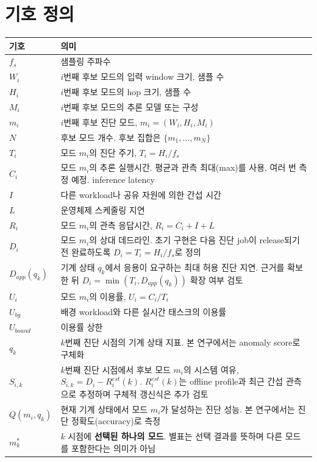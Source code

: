 \documentclass[10pt]{article}
\begin{document}
\section{기호 정의}
\begin{center}\footnotesize
\begin{tabular}{@{}lL{13cm}@{}}
\toprule
기호 & 의미 \\ \midrule
$f_s$ & 샘플링 주파수 \\
$W_i$ & $i$번째 후보 모드의 입력 window 크기, 샘플 수 \\
$H_i$ & $i$번째 후보 모드의 hop 크기, 샘플 수 \\
$M_i$ & $i$번째 후보 모드의 추론 모델 또는 구성 \\
$m_i$ & $i$번째 후보 진단 모드, $m_i = (W_i, H_i, M_i)$ \\
$N$ & 후보 모드 개수. 후보 집합은 $\{m_1, \dots, m_N\}$ \\
$T_i$ & 모드 $m_i$의 진단 주기, $T_i = H_i / f_s$ \\
$C_i$ & 모드 $m_i$의 추론 실행시간. 평균과 관측 최대(max)를 사용, 여러 번 측정 예정. inference latency \\
$I$ & 다른 workload나 공유 자원에 의한 간섭 시간 \\
$L$ & 운영체제 스케줄링 지연 \\
$R_i$ & 모드 $m_i$의 관측 응답시간, $R_i = C_i + I + L$ \\
$D_i$ & 모드 $m_i$의 상대 데드라인. 초기 구현은 다음 진단 job이 release되기 전 완료하도록 $D_i=T_i=H_i/f_s$로 정의 \\
$D_{app}(q_k)$ & 기계 상태 $q_k$에서 응용이 요구하는 최대 허용 진단 지연. 근거를 확보한 뒤 $D_i=\min(T_i,D_{app}(q_k))$ 확장 여부 검토 \\
$U_i$ & 모드 $m_i$의 이용률, $U_i = C_i / T_i$ \\
$U_{bg}$ & 배경 workload와 다른 실시간 태스크의 이용률 \\
$U_{bound}$ & 이용률 상한 \\
$q_k$ & $k$번째 진단 시점의 기계 상태 지표. 본 연구에서는 anomaly score로 구체화 \\
$S_{i,k}$ & $k$번째 진단 시점에서 후보 모드 $m_i$의 시스템 여유, $S_{i,k}=D_i-R_i^{est}(k)$. $R_i^{est}(k)$는 offline profile과 최근 간섭 관측으로 추정하며 구체적 갱신식은 추가 검토 \\
$Q(m_i, q_k)$ & 현재 기계 상태에서 모드 $m_i$가 달성하는 진단 성능. 본 연구에서는 진단 정확도(accuracy)로 측정 \\
$m^{*}_k$ & $k$ 시점에 \textbf{선택된 하나의 모드}. 별표는 선택 결과를 뜻하며 다른 모드를 포함한다는 의미가 아님 \\
\bottomrule
\end{tabular}
\end{center}
\end{document}
